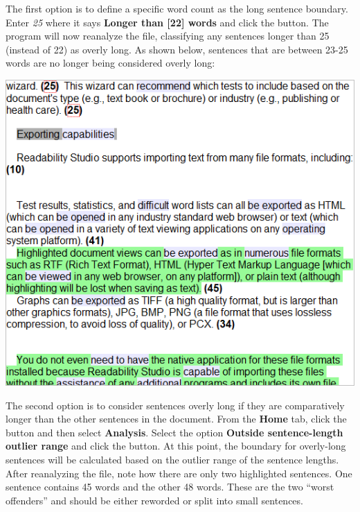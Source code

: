 \documentclass[
]{book}
\theoremstyle{definition}
\theoremstyle{definition}
\theoremstyle{definition}
\theoremstyle{definition}
\theoremstyle{remark}
\begin{document}
The first option is to define a specific word count as the long sentence boundary. Enter \emph{25} where it says \textbf{Longer than {[}22{]} words} and click the  button. The program will now reanalyze the file, classifying any sentences longer than 25 (instead of 22) as overly long. As shown below, sentences that are between 23-25 words are no longer being considered overly long:

\includegraphics{Images/featuressentences25.png}

The second option is to consider sentences overly long if they are comparatively longer than the other sentences in the document. From the \textbf{Home} tab, click the  button and then select \textbf{Analysis}. Select the option \textbf{Outside sentence-length outlier range} and click the  button. At this point, the boundary for overly-long sentences will be calculated based on the outlier range of the sentence lengths. After reanalyzing the file, note how there are only two highlighted sentences. One sentence contains 45 words and the other 48 words. These are the two ``worst offenders'' and should be either reworded or split into small sentences.
\end{document}
